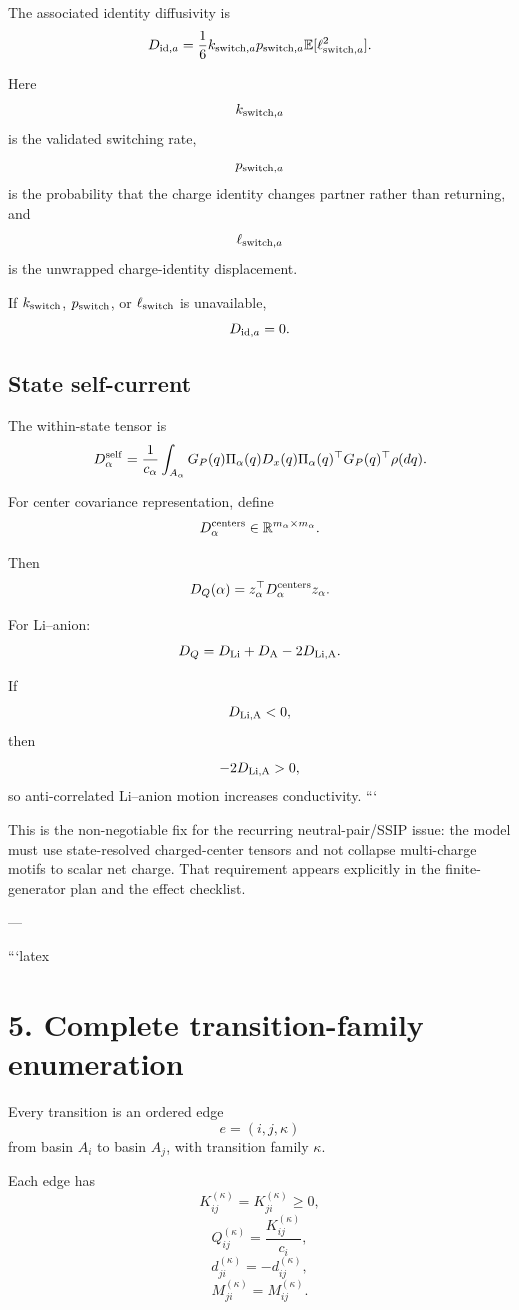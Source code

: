 The associated identity diffusivity is
\[
D_{{\rm id},a}
=
\frac{1}{6}
k_{{\rm switch},a}
p_{{\rm switch},a}
\mathbb E[\ell_{{\rm switch},a}^{2}].
\]

Here
\[
k_{{\rm switch},a}
\]
is the validated switching rate,
\[
p_{{\rm switch},a}
\]
is the probability that the charge identity changes partner rather than returning,
and
\[
\ell_{{\rm switch},a}
\]
is the unwrapped charge-identity displacement.

If \(k_{\rm switch}\), \(p_{\rm switch}\), or \(\ell_{\rm switch}\) is unavailable,
\[
D_{{\rm id},a}=0.
\]

\subsection{State self-current}

The within-state tensor is
\[
D_\alpha^{\rm self}
=
\frac{1}{c_\alpha}
\int_{A_\alpha}
G_P(q)\Pi_\alpha(q)D_x(q)\Pi_\alpha(q)^\top G_P(q)^\top
\rho(dq).
\]

For center covariance representation, define
\[
D_\alpha^{\rm centers}\in\mathbb R^{m_\alpha\times m_\alpha}.
\]

Then
\[
D_Q(\alpha)=z_\alpha^\top D_\alpha^{\rm centers}z_\alpha.
\]

For Li--anion:
\[
D_Q
=
D_{\rm Li}
+
D_{\rm A}
-
2D_{\rm Li,A}.
\]

If
\[
D_{\rm Li,A}<0,
\]
then
\[
-2D_{\rm Li,A}>0,
\]
so anti-correlated Li--anion motion increases conductivity.
```

This is the non-negotiable fix for the recurring neutral-pair/SSIP issue: the model must use state-resolved charged-center tensors and not collapse multi-charge motifs to scalar net charge. That requirement appears explicitly in the finite-generator plan and the effect checklist.  

---

```latex
\section{5. Complete transition-family enumeration}

Every transition is an ordered edge
\[
e=(i,j,\kappa)
\]
from basin \(A_i\) to basin \(A_j\), with transition family \(\kappa\).

Each edge has
\[
K_{ij}^{(\kappa)}=K_{ji}^{(\kappa)}\ge0,
\]
\[
Q_{ij}^{(\kappa)}=\frac{K_{ij}^{(\kappa)}}{c_i},
\]
\[
d_{ji}^{(\kappa)}=-d_{ij}^{(\kappa)},
\]
\[
M_{ji}^{(\kappa)}=M_{ij}^{(\kappa)}.
\]

